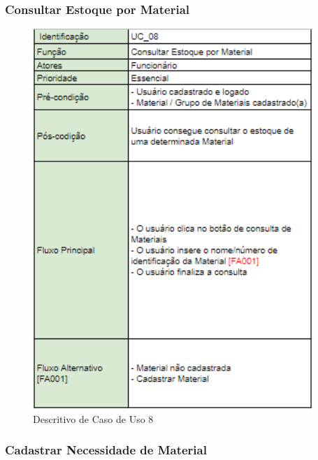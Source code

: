 \documentclass[rascunho,xindy,acronym,symbols]{fei}
\begin{document}
\subsubsection{Consultar Estoque por Material}

\begin{figure}[H]
    \centering
    \includegraphics[scale=0.6, width=300pt]{./Images/Descritivos/UC8.png}
    \caption{Descritivo de Caso de Uso 8}
     \label{fig:desc_uc8}
\end{figure}


\subsubsection{Cadastrar Necessidade de Material}
\end{document}
